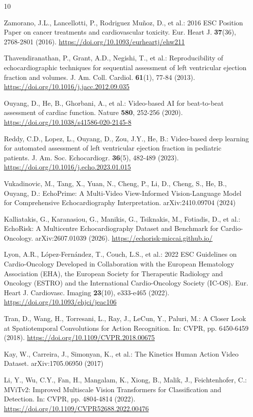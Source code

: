 \documentclass[runningheads]{llncs}
\providecommand{\doi}[1]{\href{https://doi.org/#1}{https://doi.org/#1}}
\begin{document}
\begin{thebibliography}{10}

Zamorano, J.L., Lancellotti, P., Rodriguez Mu\~noz, D., et al.: 2016 ESC Position Paper on cancer treatments and cardiovascular toxicity. Eur. Heart J. \textbf{37}(36), 2768-2801 (2016). \doi{10.1093/eurheartj/ehw211}

Thavendiranathan, P., Grant, A.D., Negishi, T., et al.: Reproducibility of echocardiographic techniques for sequential assessment of left ventricular ejection fraction and volumes. J. Am. Coll. Cardiol. \textbf{61}(1), 77-84 (2013). \doi{10.1016/j.jacc.2012.09.035}

Ouyang, D., He, B., Ghorbani, A., et al.: Video-based AI for beat-to-beat assessment of cardiac function. Nature \textbf{580}, 252-256 (2020). \doi{10.1038/s41586-020-2145-8}

Reddy, C.D., Lopez, L., Ouyang, D., Zou, J.Y., He, B.: Video-based deep learning for automated assessment of left ventricular ejection fraction in pediatric patients. J. Am. Soc. Echocardiogr. \textbf{36}(5), 482-489 (2023). \doi{10.1016/j.echo.2023.01.015}

Vukadinovic, M., Tang, X., Yuan, N., Cheng, P., Li, D., Cheng, S., He, B., Ouyang, D.: EchoPrime: A Multi-Video View-Informed Vision-Language Model for Comprehensive Echocardiography Interpretation. arXiv:2410.09704 (2024)

Kalliatakis, G., Karanasiou, G., Manikis, G., Tsiknakis, M., Fotiadis, D., et al.: EchoRisk: A Multicentre Echocardiography Dataset and Benchmark for Cardio-Oncology. arXiv:2607.01039 (2026). \url{https://echorisk-miccai.github.io/}

Lyon, A.R., L{\'o}pez-Fern{\'a}ndez, T., Couch, L.S., et al.: 2022 ESC Guidelines on Cardio-Oncology Developed in Collaboration with the European Hematology Association (EHA), the European Society for Therapeutic Radiology and Oncology (ESTRO) and the International Cardio-Oncology Society (IC-OS). Eur. Heart J. Cardiovasc. Imaging \textbf{23}(10), e333-e465 (2022). \doi{10.1093/ehjci/jeac106}

Tran, D., Wang, H., Torresani, L., Ray, J., LeCun, Y., Paluri, M.: A Closer Look at Spatiotemporal Convolutions for Action Recognition. In: CVPR, pp. 6450-6459 (2018). \doi{10.1109/CVPR.2018.00675}

Kay, W., Carreira, J., Simonyan, K., et al.: The Kinetics Human Action Video Dataset. arXiv:1705.06950 (2017)

Li, Y., Wu, C.Y., Fan, H., Mangalam, K., Xiong, B., Malik, J., Feichtenhofer, C.: MViTv2: Improved Multiscale Vision Transformers for Classification and Detection. In: CVPR, pp. 4804-4814 (2022). \doi{10.1109/CVPR52688.2022.00476}

\end{thebibliography}
\end{document}
